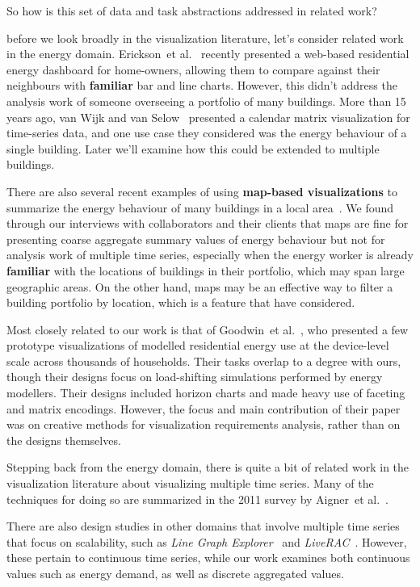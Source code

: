 \documentclass[journal]{vgtc}                %
\newcommand{\bstart}[1]{\vspace{1mm} \noindent{\textbf{#1:}}}
\newcommand{\etal}{et al.}
\begin{document}
So how is this set of data and task abstractions addressed in related work?

\bstart{Energy visualization} before we look broadly in the visualization literature, let's consider related work in the energy domain.
Erickson~\etal~\cite{Erickson2013} recently presented a web-based residential energy dashboard for home-owners, allowing them to compare against their neighbours with {\bf familiar} bar and line charts. 
However, this didn't address the analysis work of someone overseeing a portfolio of many buildings.
More than 15 years ago, van Wijk and van Selow~\cite{vanWijk1999} presented a calendar matrix visualization for time-series data, and one use case they considered was the energy behaviour of a single building.
Later we'll examine how this could be extended to multiple buildings.

There are also several recent examples of using {\bf map-based visualizations} to summarize the energy behaviour of many buildings in a local area~\cite{Heat2014,MEP2014}.
We found through our interviews with collaborators and their clients that maps are fine for presenting coarse aggregate summary values of energy behaviour but not for analysis work of multiple time series, especially when the energy worker is already {\bf familiar} with the locations of buildings in their portfolio, which may span large geographic areas. 
On the other hand, maps may be an effective way to filter a building portfolio by location, which is a feature that have considered.

Most closely related to our work is that of Goodwin~\etal~\cite{Goodwin2013}, who presented a few prototype visualizations of modelled residential energy use at the device-level scale across thousands of households. 
Their tasks overlap to a degree with ours, though their designs focus on load-shifting simulations performed by energy modellers. 
Their designs included horizon charts and made heavy use of faceting and matrix encodings. 
However, the focus and main contribution of their paper was on creative methods for visualization requirements analysis, rather than on the designs themselves.

\bstart{Multiple time-series visualization} Stepping back from the energy domain, there is quite a bit of related work in the visualization literature about visualizing multiple time series. 
Many of the techniques for doing so are summarized in the 2011 survey by Aigner~\etal~\cite{Aigner2011}.

There are also design studies in other domains that involve multiple time series that focus on scalability, such as {\it Line Graph Explorer}~\cite{Lam2007} and {\it LiveRAC}~\cite{McLachlan2008}. 
However, these pertain to continuous time series, while our work examines both continuous values such as energy demand, as well as discrete aggregated values.
\end{document}

